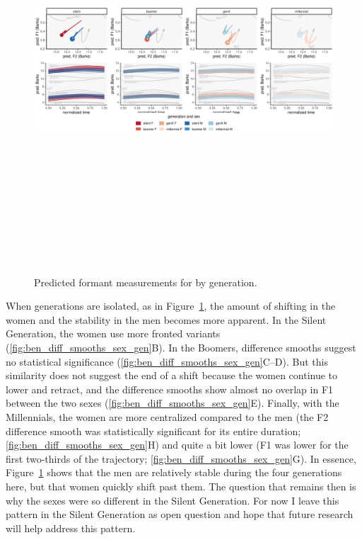 \begin{figure}[p]
	\centering
	\includegraphics[angle = 90, origin = c, height = 6in]{Figures/BEN/BEN_sex_panel_plot_wide.pdf}
	\caption[Predicted formant measurements for \ben by generation.]{Predicted formant measurements for \ben by generation.}
	\label{fig:BEN_sex_panel_plot_wide}
\end{figure}

When generations are isolated, as in Figure~\ref{fig:BEN_sex_panel_plot_wide}, the amount of shifting in the women and the stability in the men becomes more apparent. In the Silent Generation, the women use more fronted variants (\ref{fig:ben_diff_smooths_sex_gen}B). In the Boomers, difference smooths suggest no statistical significance (\ref{fig:ben_diff_smooths_sex_gen}C--D). But this similarity does not suggest the end of a shift because the women continue to lower and retract, and the difference smooths show almost no overlap in F1 between the two sexes (\ref{fig:ben_diff_smooths_sex_gen}E). Finally, with the Millennials, the women are more centralized compared to the men (the F2 difference smooth was statistically significant for its entire duration; \ref{fig:ben_diff_smooths_sex_gen}H) and quite a bit lower (F1 was lower for the first two-thirds of the trajectory; \ref{fig:ben_diff_smooths_sex_gen}G). In essence, Figure~\ref{fig:BEN_sex_panel_plot_wide} shows that the men are relatively stable during the four generations here, but that women quickly shift past them. The question that remains then is why the sexes were so different in the Silent Generation. For now I leave this pattern in the Silent Generation as open question and hope that future research will help address this pattern.

